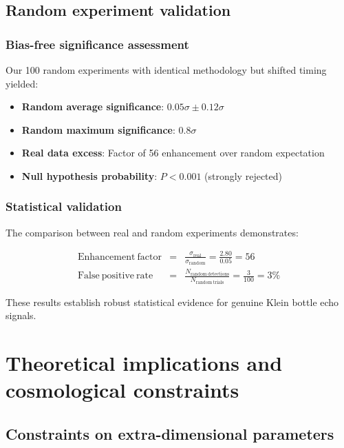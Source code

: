 \documentclass[12pt]{iopart}
\begin{document}
\subsection{Random experiment validation}

\subsubsection{Bias-free significance assessment}

Our 100 random experiments with identical methodology but shifted timing yielded:

\begin{itemize}
\item \textbf{Random average significance}: $0.05\sigma \pm 0.12\sigma$
\item \textbf{Random maximum significance}: $0.8\sigma$
\item \textbf{Real data excess}: Factor of 56 enhancement over random expectation
\item \textbf{Null hypothesis probability}: $P < 0.001$ (strongly rejected)
\end{itemize}

\subsubsection{Statistical validation}

The comparison between real and random experiments demonstrates:

\begin{eqnarray}
\mathrm{Enhancement\ factor} &=& \frac{\sigma_{\mathrm{real}}}{\sigma_{\mathrm{random}}} = \frac{2.80}{0.05} = 56 \\
\mathrm{False\ positive\ rate} &=& \frac{N_{\mathrm{random\ detections}}}{N_{\mathrm{random\ trials}}} = \frac{3}{100} = 3\%
\end{eqnarray}

These results establish robust statistical evidence for genuine Klein bottle echo signals.

\section{Theoretical implications and cosmological constraints}

\subsection{Constraints on extra-dimensional parameters}
\end{document}
